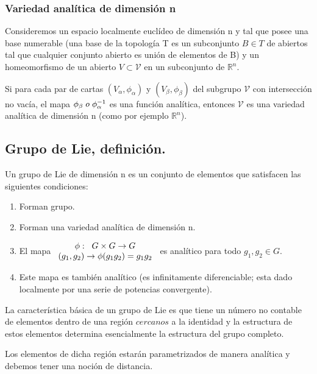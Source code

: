 \documentclass{article}
\begin{document}
\subsubsection{Variedad analítica de dimensión n}

Consideremos un espacio localmente euclídeo de dimensión n y tal que posee una base numerable (una base de la topología T es un subconjunto $B \in T$ de abiertos tal que cualquier conjunto abierto es unión de elementos de B) y un homeomorfismo de un abierto $V \subset \mathcal{V}$ en un subconjunto de $\mathds{R}^n$.

\smallskip
Si para cada par de cartas $(V_\alpha , \phi _\alpha)$ y $(V_\beta , \phi _\beta)$ del subgrupo $\mathcal{V}$ con intersección no vacía, el mapa $\phi _\beta  \hspace{0.1cm} o \hspace{0.1cm} \phi _\alpha ^{-1}$ es una función analítica, entonces $\mathcal{V}$ es una variedad analítica de dimensión n (como por ejemplo $\mathds{R}^n$).

\subsection{Grupo de Lie, definición.}

Un grupo de Lie de dimensión n es un conjunto de elementos que satisfacen las siguientes condiciones:

\begin{enumerate}
\item Forman grupo.
\item Forman una variedad analítica de dimensión n.
\item El mapa $\begin{array}{cc}
\phi: \hspace{0.2cm} G\times G \to G  \\
(g_1,g_2)\to \phi (g_1g_2)=g_1g_2
\end{array}$ es analítico para todo $g_1,g_2 \in G$.
\item Este mapa es también analítico (es infinitamente diferenciable; esta dado localmente por una serie de potencias convergente).
\end{enumerate}

La característica básica de un grupo de Lie es que tiene un número no contable de elementos dentro de una región $\textit{cercanos}$ a la identidad y la estructura de estos elementos determina esencialmente la estructura del grupo completo.

\smallskip
Los elementos de dicha región estarán parametrizados de manera analítica y debemos tener una noción de distancia.
\end{document}
